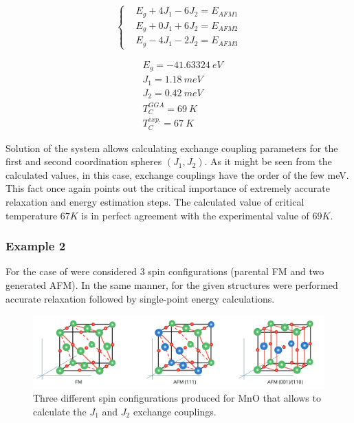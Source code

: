 \begin{multicols}{2}
\begin{equation}
  \left\{
    \begin{aligned}
      & E_g + 4J_1 - 6J_2 = E_{AFM1}\\
      & E_g + 0J_1 + 6J_2 = E_{AFM2}\\
      & E_g - 4J_1 - 2J_2 = E_{AFM3}
    \end{aligned}
  \right.
\end{equation}

\begin{equation}
    \begin{aligned}
      & E_{g} =−41.63324\ eV\\
      & J_{1} =1.18\ meV\\
      & J_{2} =0.42\ meV \\
      & T_C^{GGA} = 69\ K \\
      & T_C^{exp.} = 67\ K
    \end{aligned}
\end{equation}
\end{multicols}


Solution of the system allows calculating exchange coupling parameters for the first and second coordination spheres $(J_1, J_2)$.  As it might be seen from the calculated values, in this case, exchange couplings have the order of the few meV. This fact once again points out the critical importance of extremely accurate relaxation and energy estimation steps. The calculated value of critical temperature $67K$ is in perfect agreement with the experimental value of $69 K$.

\subsubsection{Example 2}

For the case of  were considered 3 spin configurations (parental FM and two generated AFM). In the same manner, for the given structures were performed accurate relaxation followed by single-point energy calculations. 

\begin{figure}[H]
\centering
\captionsetup{justification=centering,margin=2cm}
\includegraphics[width=160mm]{fig/dft_fig/example_2.png}
\caption[Three different spin configurations
produced for MnO.]{Three different spin configurations
produced for MnO that allows to calculate the $J_1$ and $J_2$ exchange couplings.}
\label{fig:example_2}
\end{figure}

